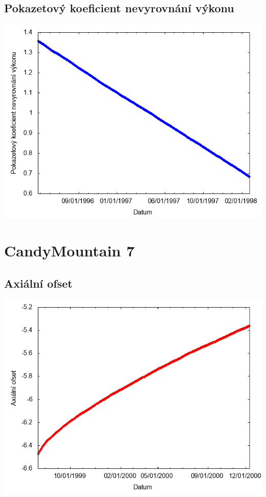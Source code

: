 \documentclass[a4paper,twoside,11pt]{article}
\begin{document}
\subsection*{Pokazetový koeficient nevyrovnání výkonu}
\begin{center}
\includegraphics[width=.8\textwidth]{graphs/CandyMountain_06_fha.png}
\end{center}

\newpage
\section*{CandyMountain 7}
\subsection*{Axiální ofset}
\begin{center}
\includegraphics[width=.8\textwidth]{graphs/CandyMountain_07_ao.png}
\end{center}
\end{document}

